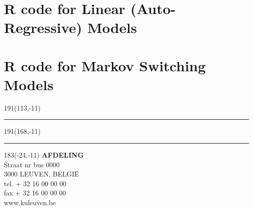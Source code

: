 \documentclass[12pt,a4paper,oneside]{book}
\begin{document}
\section*{R code for Linear (Auto-Regressive) Models}


\section*{R code for Markov Switching Models}

\newpage

\thispagestyle{empty}
\sffamily
%
\begin{textblock}{191}(113,-11)
{\color{blueline}\rule{160pt}{5.5pt}}
\end{textblock}
%
\begin{textblock}{191}(168,-11)
{\color{blueline}\rule{5.5pt}{59pt}}
\end{textblock}
%
\begin{textblock}{183}(-24,-11)
\textblockcolour{}
\flushright
\fontsize{7}{7.5}\selectfont
\textbf{AFDELING}\\
Straat nr bus 0000\\
3000 LEUVEN, BELGI\"{E}\\
tel. + 32 16 00 00 00\\
fax + 32 16 00 00 00\\
www.kuleuven.be\\
\end{textblock}
%
\end{document}
